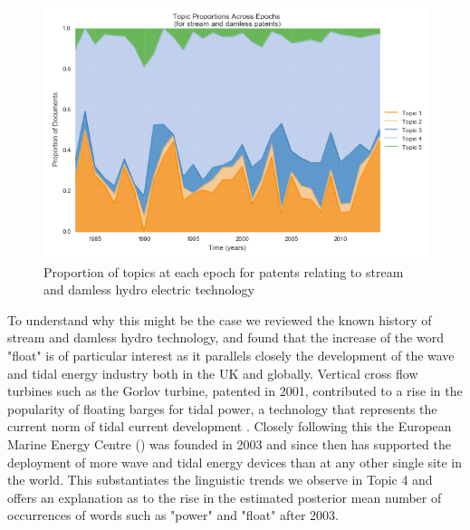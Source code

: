 \begin{figure}[!htb]
\centering
\includegraphics[width=130mm,scale=0.45]{Figures/areaplot2}
\decoRule
\caption[areaplot]{Proportion of topics at each epoch for patents relating to stream and damless hydro electric technology}
\label{fig:areaplot}
\end{figure}

To understand why this might be the case we reviewed the known history of stream and damless hydro technology, and found that the increase of the word "float" is of particular interest as it parallels closely the development of the wave and tidal energy industry both in the UK and globally. Vertical cross flow turbines such as the Gorlov turbine, patented in 2001, contributed to a rise in the popularity of floating barges for tidal power, a technology that represents the current norm of tidal current development \parencite{KhanOES}. Closely following this the European Marine Energy Centre () was founded in 2003 and since then has supported the deployment of more wave and tidal energy devices than at any other single site in the world. This substantiates the linguistic trends we observe in Topic 4 and offers an explanation as to the rise in the estimated posterior mean number of occurrences of words such as "power" and "float" after 2003.

